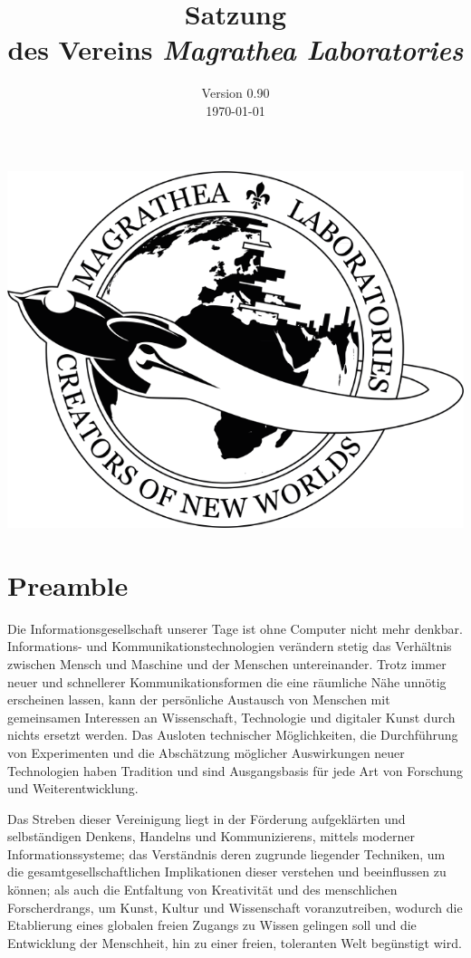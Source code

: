 \documentclass[ngerman]{article}
\title{Satzung\\
des Vereins \emph{Magrathea Laboratories}}
\date{Version 0.90\\
\today}
\begin{document}
\maketitle

\begin{center}
\emph{\includegraphics[scale=0.3]{logo}}
\par\end{center}

\thispagestyle{empty}
\pagebreak

\section{Preamble}
Die Informationsgesellschaft unserer Tage ist ohne Computer nicht mehr denkbar. Informations- und Kommunikationstechnologien verändern stetig das Verhältnis zwischen Mensch und Maschine und der Menschen untereinander. Trotz immer neuer und schnellerer Kommunikationsformen die eine  räumliche Nähe unnötig erscheinen lassen, kann der persönliche Austausch von Menschen mit gemeinsamen Interessen an Wissenschaft, Technologie und digitaler Kunst durch nichts ersetzt werden. Das Ausloten technischer Möglichkeiten, die Durchführung von Experimenten und die Abschätzung möglicher Auswirkungen neuer Technologien haben Tradition und sind Ausgangsbasis für jede Art von Forschung und Weiterentwicklung.

Das Streben dieser Vereinigung liegt in der Förderung aufgeklärten und selbständigen Denkens, Handelns und Kommunizierens, mittels moderner Informationssysteme; das Verständnis deren zugrunde liegender Techniken, um die gesamtgesellschaftlichen Implikationen dieser verstehen und beeinflussen zu können; als auch die Entfaltung von Kreativität und des menschlichen Forscherdrangs, um Kunst, Kultur und Wissenschaft voranzutreiben, wodurch die Etablierung eines globalen freien Zugangs zu Wissen gelingen soll und die Entwicklung der Menschheit, hin zu einer freien, toleranten Welt begünstigt wird.
\end{document}
